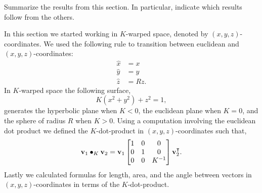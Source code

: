 \documentclass[newpage,hints,handout]{ximera}
\begin{document}


\begin{problem}
Summarize the results from this section. In particular, indicate which
results follow from the others.
\begin{freeResponse}
In this section we started working in $K$-warped space, denoted by $(x, y, z)$-coordinates. We used the following rule to transition between euclidean and  $(x, y, z)$-coordinates:
\begin{align*}
\hat{x}  &  =x\\
\hat{y}  &  =y\\
\hat{z}  &  =Rz.
\end{align*}
In $K$-warped space the following surface,
\[
K\left(x^{2}+y^{2}\right)+z^{2}=1,
\]
 generates the hyperbolic plane when $K<0$, the euclidean plane when $K=0$, and the sphere of radius $R$ when $K> 0$. Using a computation involving the euclidean dot product we defined the $K$-dot-product in $(x, y, z)$-coordinates such that,
\[
\mathbf{v}_{1}\bullet_{K}\mathbf{v}_{2}  = \mathbf{v}_{1} 
\begin{bmatrix}
1 & 0 & 0\\
0 & 1 & 0\\
0 & 0 & K^{-1}%
\end{bmatrix}
\mathbf{v}_{2}^\transpose.
\]
Lastly we calculated formulas for length, area, and the angle between vectors in $(x,y,z)$-coordinates in terms of the $K$-dot-product.
\end{freeResponse}
\end{problem}
\end{document}
